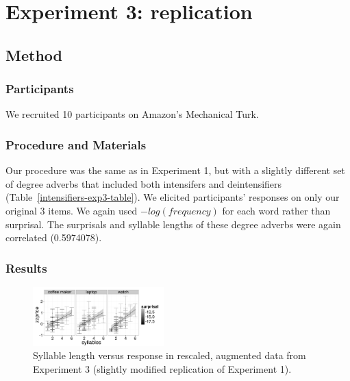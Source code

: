 \documentclass[10pt,letterpaper]{article}
\begin{document}
\section{Experiment 3: replication}
  \subsection{Method}
    \subsubsection{Participants}
      We recruited 10 participants on Amazon's Mechanical Turk.
    \subsubsection{Procedure and Materials}
    
      Our procedure was the same as in Experiment 1, but with a slightly different set of degree adverbs that included both intensifers and deintensifiers (Table~\ref{intensifiers-exp3-table}). We elicited participants' responses on only our original 3 items. We again used $-log(frequency)$ for each word rather than surprisal. The surprisals and syllable lengths of these degree adverbs were again correlated (0.5974078).
  
  \subsubsection{Results}
%   
    \begin{figure}[ht]
    \begin{center}
    \includegraphics[width=0.45\textwidth]{exp3-intensifiers-zz-syllables.png}
    \end{center}
    \caption{Syllable length versus response in rescaled, augmented data from Experiment 3 (slightly modified replication of Experiment 1).} 
    \label{exp3-intensifiers}
    \end{figure}
    
\end{document}
